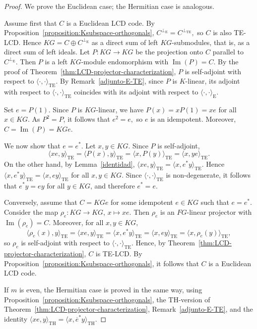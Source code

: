 \documentclass[11pt]{article}
\begin{document}
\begin{proof}
We prove the Euclidean case; the Hermitian case is analogous.

Assume first that $C$ is a Euclidean LCD code. By Proposition~\ref{proposition:Ksubspace-orthogonals},
$
C^{\perp_{\mathrm{E}}}=C^{\perp_{\mathrm{TE}}},
$
so $C$ is also TE-LCD. Hence
$
KG=C\oplus C^{\perp_{\mathrm{E}}}
$
as a direct sum of left $KG$-submodules, that is, as a direct sum of left ideals. Let
$
P:KG\longrightarrow KG
$
be the projection onto $C$ parallel to $C^{\perp_{\mathrm{E}}}$. Then $P$ is a left $KG$-module endomorphism with $\operatorname{Im}(P)=C$. By the proof of Theorem~\ref{thm:LCD-projector-characterization}, $P$ is self-adjoint with respect to $\langle\cdot,\cdot\rangle_{\mathrm{TE}}$. By Remark~\ref{adjunto-E-TE}, since $P$ is $K$-linear, its adjoint with respect to $\langle\cdot,\cdot\rangle_{\mathrm{TE}}$ coincides with its adjoint with respect to $\langle\cdot,\cdot\rangle_{\mathrm{E}}$.

Set
$
e=P(1).
$
Since $P$ is $KG$-linear, we have
$
P(x)=xP(1)=xe
$
for all $x\in KG$. As $P^2=P$, it follows that
$
e^2=e,
$
so $e$ is an idempotent. Moreover,
$
C=\operatorname{Im}(P)=KGe.
$

We now show that $e=e^\ast$. Let $x,y\in KG$. Since $P$ is self-adjoint,
$$
\langle xe,y\rangle_{\mathrm{TE}}
=
\langle P(x),y\rangle_{\mathrm{TE}}
=
\langle x,P(y)\rangle_{\mathrm{TE}}
=
\langle x,ye\rangle_{\mathrm{TE}}.
$$
On the other hand, by Lemma~\ref{identidad},
$
\langle xe,y\rangle_{\mathrm{TE}}=\langle x,e^\ast y\rangle_{\mathrm{TE}}.
$
Hence
$
\langle x,e^\ast y\rangle_{\mathrm{TE}}=\langle x,ey\rangle_{\mathrm{TE}}
$
for all $x,y\in KG$. Since $\langle\cdot,\cdot\rangle_{\mathrm{TE}}$ is non-degenerate, it follows that
$
e^\ast y=ey
$
for all $y\in KG$, and therefore $e^\ast=e$.

Conversely, assume that
$
C=KGe
$
for some idempotent $e\in KG$ such that $e=e^\ast$. Consider the map
$
\rho_e:KG\longrightarrow KG$, \;$x\mapsto xe.
$
Then $\rho_e$ is an $FG$-linear projector with $\operatorname{Im}(\rho_e)=C$. Moreover, for all $x,y\in KG$,
$$
\langle \rho_e(x),y\rangle_{\mathrm{TE}}
=
\langle xe,y\rangle_{\mathrm{TE}}
=
\langle x,e^\ast y\rangle_{\mathrm{TE}}
=
\langle x,ey\rangle_{\mathrm{TE}}
=
\langle x,\rho_e(y)\rangle_{\mathrm{TE}},
$$
so $\rho_e$ is self-adjoint with respect to $\langle\cdot,\cdot\rangle_{\mathrm{TE}}$. Hence, by Theorem~\ref{thm:LCD-projector-characterization}, $C$ is TE-LCD. By Proposition~\ref{proposition:Ksubspace-orthogonals}, it follows that $C$ is a Euclidean LCD code.

If $m$ is even, the Hermitian case is proved in the same way, using Proposition~\ref{proposition:Ksubspace-orthogonals}, the TH-version of Theorem~\ref{thm:LCD-projector-characterization}, Remark~\ref{adjunto-E-TE}, and the identity
$
\langle xe,y\rangle_{\mathrm{TH}}=\langle x,\overline{e}^\ast y\rangle_{\mathrm{TH}}.
$
\end{proof}
\end{document}
